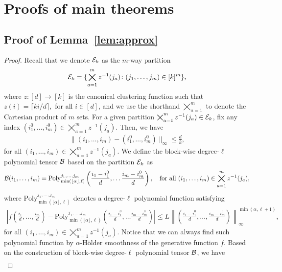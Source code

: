 \documentclass[12pt]{article}
\theoremstyle{definition}
\begin{document}
\section{Proofs of main theorems}\label{app:theorem}
\subsection{Proof of Lemma~\ref{lem:approx}}
\begin{proof}
Recall that we denote $\mathcal{E}_k$ as the $m$-way partition
\begin{align}
    \mathcal{E}_k = \{\bigtimes_{a=1}^m z^{-1}(j_a)\colon (j_1,\ldots,j_m)\in [k]^m\}, 
\end{align}
where $z\colon [d]\rightarrow[k]$ is the canonical clustering function such that $z(i) = \lceil ki/d\rceil,$ for all $i \in[d]$, and we use the shorthand $\bigtimes_{a=1}^m$ to denote the Cartesian product of $m$ sets. For a given partition  $ \bigtimes_{a=1}^m z^{-1}(j_a)\in\mathcal{E}_k$, fix any index  $(i_1^0,\ldots,i_m^0)\in \bigtimes_{a=1}^m z^{-1}(j_a)$. Then, we have 
\begin{align}\label{eq:ind}
\|(i_1,\ldots,i_m)-(i_1^0,\ldots,i_m^0)\|_\infty \leq \frac{d}{k},
\end{align} 
for all $(i_1,\ldots,i_m)\in \bigtimes_{a=1}^m z^{-1}(j_a)$.
We define the block-wise degree-$\ell$ polynomial tensor $\mathcal{B}$ based on the partition $\mathcal{E}_k$ as
\begin{align}
    \mathcal{B}(i_1,\ldots,i_m) = \text{Poly}^{j_1,\ldots,j_m}_{\min(\lfloor \alpha \rfloor,\ell)}\left(\frac{i_1-i_1^0}{d},\ldots\frac{i_m-i_m^0}{d}\right), \quad \text{for all } (i_1,\ldots,i_m)\in \bigtimes_{a=1}^m z^{-1}(j_a),
\end{align}
where $\text{Poly}^{j_1,\ldots,j_m}_{\min(\lfloor \alpha \rfloor,\ell)}$ denotes a degree-$\ell$ polynomial function satisfying
\begin{align}\label{eq:polyapp}
\left|f\left(\frac{i_1}{d},\ldots,\frac{i_m}{d}\right)-\text{Poly}^{j_1,\ldots,j_m}_{\min(\lfloor \alpha \rfloor,\ell)}\left(\frac{i_1-i_1^0}{d},\ldots\frac{i_m-i_m^0}{d}\right)\right|\leq L\left\|\left(\frac{i_1-i_1^0}{d},\ldots,\frac{i_m-i_m^0}{d}\right)\right\|_\infty^{\min(\alpha,\ell+1)},
\end{align}
for all $(i_1,\ldots,i_m)\in \bigtimes_{a=1}^m z^{-1}(j_a).$
Notice that we can always find such polynomial function by $\alpha$-H\"older smoothness of the generative function $f$.
Based on the construction of block-wise degree-$\ell$ polynomial tensor $\mathcal{B}$, we have 
\begin{align}

\end{align}
\end{proof}
\end{document}
